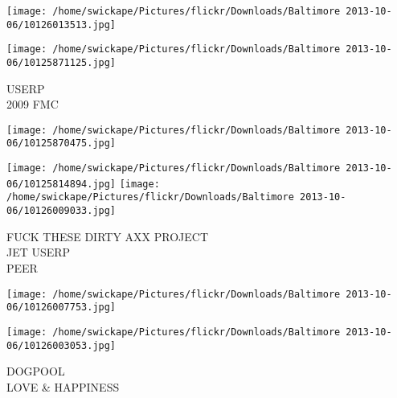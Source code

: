 \documentclass[10pt,letterpaper]{article}
\begin{document}
\texttt{[image: /home/swickape/Pictures/flickr/Downloads/Baltimore 2013-10-06/10126013513.jpg]}

\vspace{0.25in}
\texttt{[image: /home/swickape/Pictures/flickr/Downloads/Baltimore 2013-10-06/10125871125.jpg]}

USERP\\
2009 FMC
\pagebreak

\texttt{[image: /home/swickape/Pictures/flickr/Downloads/Baltimore 2013-10-06/10125870475.jpg]}

\vspace{0.25in}
\texttt{[image: /home/swickape/Pictures/flickr/Downloads/Baltimore 2013-10-06/10125814894.jpg]}
\texttt{[image: /home/swickape/Pictures/flickr/Downloads/Baltimore 2013-10-06/10126009033.jpg]}

FUCK THESE DIRTY AXX PROJECT\\
JET USERP\\
PEER
\pagebreak

\texttt{[image: /home/swickape/Pictures/flickr/Downloads/Baltimore 2013-10-06/10126007753.jpg]}

\vspace{0.25in}
\texttt{[image: /home/swickape/Pictures/flickr/Downloads/Baltimore 2013-10-06/10126003053.jpg]}

DOGPOOL\\
LOVE \& HAPPINESS
\pagebreak
\end{document}
